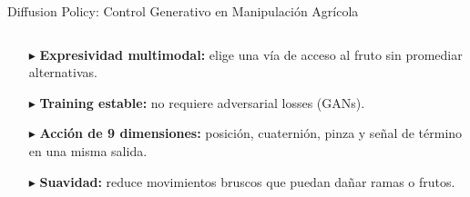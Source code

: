 \documentclass[aspectratio=169,10pt,xcolor={dvipsnames,table}]{beamer}
\newcommand{\CardTitleFont}{\fontsize{7.5}{9}\selectfont\bfseries}      %
\newcommand{\BodyFont}{\fontsize{6.2}{7.8}\selectfont}                  %
\newcommand{\CardArc}{2pt}                 %
\newcommand{\CardRule}{0.6pt}              %
\newcommand{\CardHeightDouble}{42.5mm}     %
\begin{document}
\begin{frame}{Diffusion Policy: Control Generativo en Manipulación Agrícola}
\begin{columns}[T, onlytextwidth]
    \begin{column}{0.39\textwidth}
      \begin{tcolorbox}[
        enhanced,
        colback=GoldGORELight,
        colframe=GoldGORE,
        arc=\CardArc,
        boxrule=\CardRule,
        height=\CardHeightDouble,
        title={\CardTitleFont Propiedades Clave en Campo},
        colbacktitle=GoldGORE,
        coltitle=WhiteBg,
        top=1.2mm, bottom=1.2mm, left=1.8mm, right=1.8mm
      ]
        {\BodyFont
        \begin{itemize}\setlength{\itemsep}{2pt}
          \item[\textcolor{GoldGORE}{$\blacktriangleright$}] \textbf{Expresividad multimodal:} elige una vía de acceso al fruto sin promediar alternativas.
          \item[\textcolor{GoldGORE}{$\blacktriangleright$}] \textbf{Training estable:} no requiere adversarial losses (GANs).
          \item[\textcolor{GoldGORE}{$\blacktriangleright$}] \textbf{Acción de 9 dimensiones:} posición, cuaternión, pinza y señal de término en una misma salida.
          \item[\textcolor{GoldGORE}{$\blacktriangleright$}] \textbf{Suavidad:} reduce movimientos bruscos que puedan dañar ramas o frutos.
        \end{itemize}}
      \end{tcolorbox}
    \end{column}
  \end{columns}
\end{frame}
\end{document}
